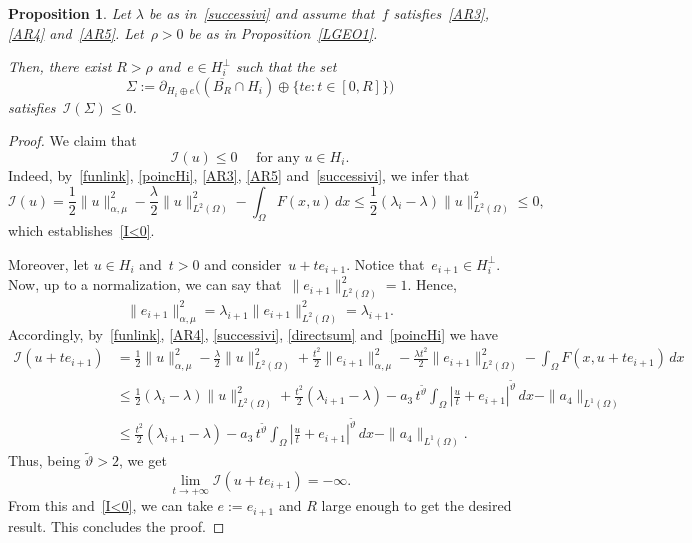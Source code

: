 \documentclass[12pt,a4paper,intlimits,sumlimits]{amsart}
\theoremstyle{definition}
\theoremstyle{plain}
\newtheorem{proposition}[definition]{Proposition}
\numberwithin{equation}{section}
\renewcommand{\le}{\leqslant}
\begin{document}
\begin{proposition}\label{LGEO2}
Let $\lambda$ be as in~\eqref{successivi} and assume that~$f$ satisfies~\eqref{AR3}, \eqref{AR4} and~\eqref{AR5}. Let~$\rho>0$ be
as in Proposition~\ref{LGEO1}.

Then, there exist $R>\rho$ and~$e\in H_i^\perp$ such that the set
\[
\Sigma:=\partial_{H_i\oplus e} \Big((\overline{B_R}\cap H_i) \oplus \{te : t\in [0, R]\} \Big)
\]
satisfies~$\mathcal I (\Sigma)\le 0$.
\end{proposition}

\begin{proof}
We claim that
\begin{equation}\label{I<0}
\mathcal I(u)\le 0 \quad\mbox{ for any } u\in H_i.
\end{equation}
Indeed, by~\eqref{funlink}, \eqref{poincHi}, \eqref{AR3}, \eqref{AR5} and~\eqref{successivi}, we infer that
\[
\mathcal I(u) = \frac{1}{2}\|u\|_{{\alpha,\mu}}^2-\frac{\lambda}{2}\|u\|_{L^2(\Omega)}^2-\int_\Omega F(x,u)\,dx 
\le \frac12 (\lambda_i -\lambda) \|u\|_{L^2(\Omega)}^2\le 0,
\]
which establishes~\eqref{I<0}.

Moreover, let $u\in H_i$ and~$t>0$ and consider~$u+te_{i+1}$. Notice that~$e_{i+1}\in H_i^\perp$.
Now, up to a normalization, we can say that~$\|e_{i+1}\|_{L^2(\Omega)}^2=1$. Hence, 
\[
\|e_{i+1}\|_{\alpha, \mu}^2=\lambda_{i+1}\|e_{i+1}\|^2_{L^2(\Omega)} =\lambda_{i+1}.
\]
Accordingly, by~\eqref{funlink}, \eqref{AR4}, \eqref{successivi}, \eqref{directsum} and~\eqref{poincHi} we have 
\[
\begin{split}
\mathcal I(u+te_{i+1})&= \frac{1}{2}\|u\|_{{\alpha,\mu}}^2-\frac{\lambda}{2}\|u\|_{L^2(\Omega)}^2 +\frac{t^2}{2} \|e_{i+1}\|_{{\alpha,\mu}}^2 -\frac{\lambda t^2}{2} \|e_{i+1}\|_{L^2(\Omega)}^2 -\int_\Omega F(x,u+te_{i+1})\,dx \\
&\le \frac12 (\lambda_i -\lambda) \|u\|_{L^2(\Omega)}^2 +\frac{t^2}{2} (\lambda_{i+1}-\lambda) - a_3\, t^{\widetilde\vartheta} \int_\Omega \left|\frac{u}{t} +e_{i+1} \right|^{\widetilde\vartheta} \, dx -\|a_4\|_{L^1(\Omega)}\\
&\le \frac{t^2}{2} (\lambda_{i+1}-\lambda) - a_3\, t^{\widetilde\vartheta} \int_\Omega \left|\frac{u}{t} +e_{i+1} \right|^{\widetilde\vartheta} \, dx -\|a_4\|_{L^1(\Omega)}.
\end{split}
\]
Thus, being $\widetilde\vartheta>2$, we get 
\[
\lim_{t\to +\infty} \mathcal I(u+te_{i+1}) = -\infty.
\]
{F}rom this and~\eqref{I<0}, we can take $e:=e_{i+1}$ and $R$ large enough to get the desired result.
This concludes the proof.
\end{proof}
\end{document}
